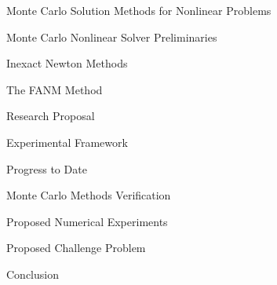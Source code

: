 \documentclass{beamer}
\begin{document}
\begin{frame}{Monte Carlo Solution Methods for Nonlinear Problems}

\end{frame}

\begin{frame}{Monte Carlo Nonlinear Solver Preliminaries}

\end{frame}

\begin{frame}{Inexact Newton Methods}

\end{frame}

\begin{frame}{The FANM Method}

\end{frame}

\begin{frame}{Research Proposal}

\end{frame}

\begin{frame}{Experimental Framework}

\end{frame}

\begin{frame}{Progress to Date}

\end{frame}

\begin{frame}{Monte Carlo Methods Verification}

\end{frame}

\begin{frame}{Proposed Numerical Experiments}

\end{frame}

\begin{frame}{Proposed Challenge Problem}

\end{frame}

\begin{frame}{Conclusion}

\end{frame}

\end{document}
